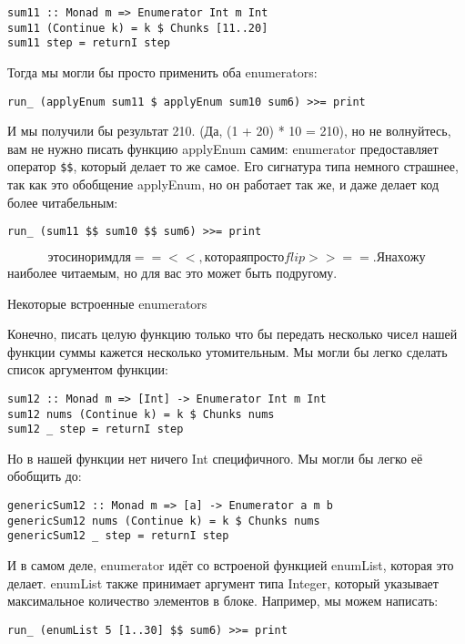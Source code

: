 \begin{lstlisting}
sum11 :: Monad m => Enumerator Int m Int
sum11 (Continue k) = k $ Chunks [11..20]
sum11 step = returnI step
\end{lstlisting}

Тогда мы могли бы просто применить оба enumerators:

\begin{lstlisting}
run_ (applyEnum sum11 $ applyEnum sum10 sum6) >>= print
\end{lstlisting}

И мы получили бы результат 210. (Да, (1 + 20) * 10 = 210), но не волнуйтесь, вам не нужно писать функцию applyEnum самим: enumerator  предоставляет оператор \lstinline!$$!, который делает то же самое. Его сигнатура типа немного страшнее, так как это обобщение applyEnum, но он работает так же, и даже делает код более читабельным:

\begin{lstlisting}
run_ (sum11 $$ sum10 $$ sum6) >>= print
\end{lstlisting}

$$ это синорим для ==<<, которая просто flip >>==. Я нахожу $$ наиболее читаемым, но для вас это может быть подругому.

Некоторые встроенные enumerators

Конечно, писать целую функцию только что бы передать несколько чисел нашей функции суммы кажется несколько утомительным. Мы могли бы легко сделать список аргументом функции:

\begin{lstlisting}
sum12 :: Monad m => [Int] -> Enumerator Int m Int
sum12 nums (Continue k) = k $ Chunks nums
sum12 _ step = returnI step
\end{lstlisting}

Но в нашей функции нет ничего Int специфичного. Мы могли бы легко её обобщить до:

\begin{lstlisting}
genericSum12 :: Monad m => [a] -> Enumerator a m b
genericSum12 nums (Continue k) = k $ Chunks nums
genericSum12 _ step = returnI step
\end{lstlisting}

И в самом деле, enumerator идёт со встроеной функцией enumList, которая это делает. enumList также принимает аргумент типа Integer, который указывает максимальное количество элементов в блоке. Например, мы можем написать:

\begin{lstlisting}
run_ (enumList 5 [1..30] $$ sum6) >>= print
\end{lstlisting}

